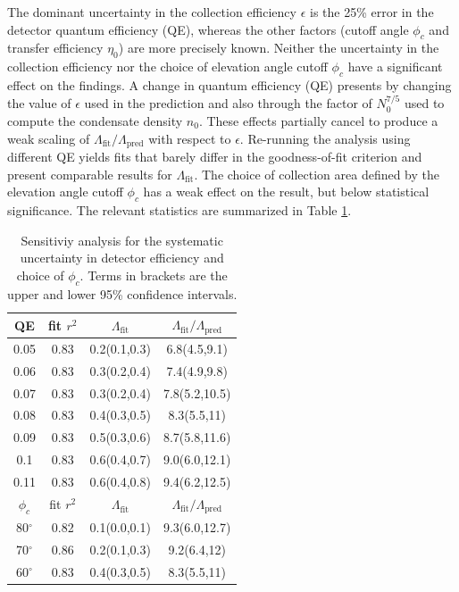 	{The dominant uncertainty in the collection efficiency $\epsilon$ is the 25\% error in the detector quantum efficiency (QE), whereas the other factors (cutoff angle $\phi_c$ and transfer efficiency $\eta_0$) are more precisely known.
	Neither the uncertainty in the collection efficiency nor the choice of elevation angle cutoff $\phi_c$ have a significant effect on the findings. A change in quantum efficiency (QE) presents by changing the value of $\epsilon$ used in the prediction and also through the factor of $N_{0}^{7/5}$ used to compute the condensate density $n_0$. These effects partially cancel to produce a weak scaling of $\Lambda_\textrm{fit}/\Lambda_\textrm{pred}$ with respect to $\epsilon$.  Re-running the analysis using different QE yields fits that barely differ in the goodness-of-fit criterion and present comparable results for $\Lambda_\textrm{fit}$. The choice of collection area defined by the elevation angle cutoff $\phi_c$ has a weak effect on the result, but below statistical significance. 
	The relevant statistics are summarized in Table \ref{tab:choice_indep}.}

	\begin{table}
		\begin{minipage}{0.6\textwidth}
		\vspace{0cm}
		\begin{tabular}{c c c c}
			\hline\hline

			QE & fit $r^2$ &  $\Lambda_\textrm{fit}$ & $\Lambda_\textrm{fit}/\Lambda_\textrm{pred}$\\      
			\hline
			0.05    &   0.83   &   0.2(0.1,0.3)  &  6.8(4.5,9.1)\\
			0.06    &   0.83   &   0.3(0.2,0.4)  &  7.4(4.9,9.8)\\
			0.07    &   0.83   &   0.3(0.2,0.4)  &  7.8(5.2,10.5)\\
			0.08    &   0.83   &   0.4(0.3,0.5)  &  8.3(5.5,11)\\
			0.09    &   0.83   &   0.5(0.3,0.6)  &  8.7(5.8,11.6)\\
			0.1     &   0.83   &   0.6(0.4,0.7)  &  9.0(6.0,12.1)\\
			0.11    &   0.83   &   0.6(0.4,0.8)  &  9.4(6.2,12.5)\\
			\hline
			$\phi_c$ & fit $r^2$ &  $\Lambda_\textrm{fit}$ & $\Lambda_\textrm{fit}/\Lambda_\textrm{pred}$\\
			\hline
			80$^\circ$    &   0.82   &   0.1(0.0,0.1) &  9.3(6.0,12.7)\\
			70$^\circ$    &   0.86   &   0.2(0.1,0.3) &  9.2(6.4,12)\\
			60$^\circ$    &   0.83   &   0.4(0.3,0.5) &  8.3(5.5,11)\\
			\hline\hline
		\end{tabular}
		\end{minipage}
		\hfill
		\begin{minipage}{0.4\textwidth}
		\vspace{0cm}
		\caption{Sensitiviy analysis for the systematic uncertainty in detector efficiency and choice of $\phi_c$. Terms in brackets are the upper and lower 95\% confidence intervals.}
		\label{tab:choice_indep}
		\end{minipage}
	\end{table}


